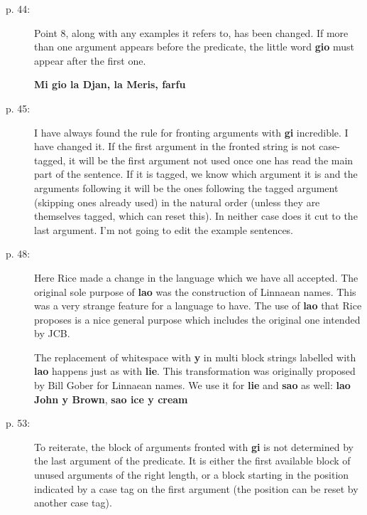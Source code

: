 \documentclass[12pt]{article}
\begin{document}
\begin{description}

\item[p. 44:]  Point 8, along with any examples it refers to, has been changed.  If more than one argument appears before the predicate, the little word {\bf gio} must appear after the first one.

{\bf Mi gio la Djan, la Meris, farfu}

\item[p. 45:]  I have always found the rule for fronting arguments with {\bf gi} incredible.  I have changed it.
If the first argument in the fronted string is not case-tagged, it will be the first argument not used once one has read the main part of the sentence.  If it is tagged, we know which argument it is and the arguments following it will be the ones following the tagged argument (skipping ones already used) in the natural order (unless they are themselves tagged, which can reset this).  In neither case does it cut to the last argument.  I'm not going to edit the example sentences.

\item[p. 48:]  Here Rice made a change in the language which we have all accepted.  The original sole purpose of
{\bf lao} was the construction of Linnaean names.  This was a very strange feature for a language to have.  The use of {\bf lao} that Rice proposes is a nice general purpose which includes the original one intended by JCB.

The replacement of whitespace with {\bf y} in multi block strings labelled with {\bf lao} happens just as with {\bf lie}.
This transformation was originally proposed by Bill Gober for Linnaean names.  We use it for {\bf lie} and {\bf sao} as well:  {\bf lao John y Brown}, {\bf sao ice y cream}

\item[p. 53:]  To reiterate, the block of arguments fronted with {\bf gi} is not determined by the last argument of the predicate.  It is either the first available block of unused arguments of the right length, or a block starting in the position indicated by a case tag on the first argument (the position can be reset by another case tag).

\end{description}
\end{document}
